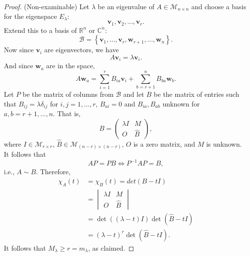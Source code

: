 \documentclass[a4paper]{article}
\begin{document}
    \begin{proof}(Non-examinable) Let $\lambda$ be an eigenvalue of
      $A\in \mathcal{M}_{n\times n}$ and choose a basis for the
      eigenspace $ E_\lambda $:
      \[
        \mathbf{v}_1,\mathbf{v}_2,\dots,\mathbf{v}_r.
      \]
      Extend this to a basis of $ \mathbb{R}^{n} $ or $ \mathbb{C}^{n} $:
      \[
        \mathcal{B}=\left\{
          \mathbf{v}_1,\dots,\mathbf{v}_r,\mathbf{w}_{r+1},\dots,
        \mathbf{w}_{n} \right\}.
      \]
      Now since $\mathbf{v}_i$ are eigenvectors, we have
      \[
        A \mathbf{v}_i = \lambda \mathbf{v}_i.
      \]
      And since $\mathbf{w}_a$ are in the space,
      \[
        A \mathbf{w}_a = \sum_{i=1}^{r} B_{ia} \mathbf{v}_i +
        \sum_{b=r+1}^{n} B_{ba} \mathbf{w}_{b}.
      \]
      Let $P$ be the matrix of columns from $ \mathcal{B} $ and let
      $B$ be the matrix of entries such that $B_{ij}=\lambda
      \delta_{ij}$ for $i,j=1,\dots,r$, $B_{ai}=0$ and $
      B_{ia},B_{ab} $ unknown for $ a,b=r+1,\dots,n $. That is,
      \[
        B =
        \begin{pmatrix}
          \lambda I & M\\
          O & \hat{B}
        \end{pmatrix},
      \]
      where $I\in \mathcal{M}_{r\times r}$, $ \hat{B}\in
      \mathcal{M}_{(n-r)\times (n-r)} $, $O$ is a zero matrix, and
      $M$ is unknown. It follows that
      \[
        AP=PB \Longleftrightarrow P^{-1}AP=B,
      \]
      i.e., $A\sim B$. Therefore,
      \begin{align*}
        \chi_A(t)&=\chi_B(t)=det(B-tI)\\
        &=
        \begin{vmatrix}
          \lambda I & M\\
          O & \hat{B}
        \end{vmatrix}\\
        &= \det ((\lambda-t)I)\det (\hat{B}-tI)\\
        &= (\lambda-t)^{r}\det (\hat{B}-tI).
      \end{align*}
      It follows that $ M_\lambda\ge r = m_\lambda $, as claimed.
    \end{proof}
\end{document}

